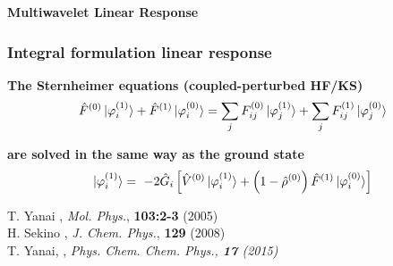 \begin{frame}
    \centering
    \textbf{\Large{Multiwavelet Linear Response}}
\end{frame}

\begin{frame}
    \frametitle{Integral formulation linear response}
    \centering
    \textbf{The Sternheimer equations (coupled-perturbed HF/KS)}
    \begin{equation}
        \nonumber
        \hat{F}^{(0)}\ket{\varphi_i^{(1)}} + \hat{F}^{(1)}\ket{\varphi_i^{(0)}} = 
        \sum_jF_{ij}^{(0)}\ket{\varphi_j^{(1)}} + \sum_j F_{ij}^{(1)}\ket{\varphi_j^{(0)}}
    \end{equation}

    \vspace{10mm}

    \textbf{are solved in the same way as the ground state}
    \begin{align}
        \nonumber
        \ket{\varphi_i^{(1)}} =\
        -2\hat{G}_i\left[\hat{V}^{(0)}\ket{\varphi_i^{(1)}}
        + \left(1 - \hat{\rho}^{(0)}\right)\hat{F}^{(1)}\ket{\varphi_i^{(0)}}\right]
    \end{align}

\vspace{5mm}
\centering
\tiny
T. Yanai \etal,
{\it Mol. Phys.},
\textbf{103:2-3} 
(2005)\\
H. Sekino \etal,
{\it J. Chem. Phys.},
\textbf{129} 
(2008)\\
T. Yanai, \etal,
\it{Phys. Chem. Chem. Phys.}, 
\textbf{17}
(2015)

\end{frame}


